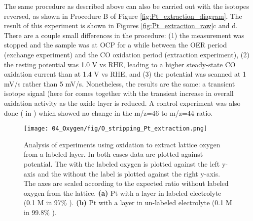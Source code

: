 The same procedure as described above can also be carried out with the isotopes reversed, as shown in Procedure B of Figure \ref{fig:Pt_extraction_diagram}. The result of this experiment is shown in Figures \ref{fig:Pt_extraction_raw}c and d. There are a couple small differences in the procedure: (1) the measurement was stopped and the sample was at OCP for a while between the OER period (exchange experiment) and the CO oxidation period (extraction experiment), (2) the resting potential was 1.0 V vs RHE, leading to a higher steady-state CO oxidation current than at 1.4 V vs RHE, and (3) the potential was scanned at 1 mV/s rather than 5 mV/s. Nonetheless, the results are the same: a transient isotope signal (here for  comes together with the transient increase in overall  oxidation activity as the oxide layer is reduced. A control experiment was also done ( in ) which showed no change in the m/z=46 to m/z=44 ratio.

\begin{figure}[h!]
	\centering
	\texttt{[image: 04\_Oxygen/fig/O\_stripping\_Pt\_extraction.png]}
	\caption{
		Analysis of experiments using  oxidation to extract lattice oxygen from a labeled  layer. In both cases data are plotted against potential. The  with the labeled oxygen is plotted against the left y-axis and the  without the label is plotted against the right y-axis. The axes are scaled according to the expected ratio without labeled oxygen from the lattice. \textbf{(a)} Pt with a  layer in labeled electrolyte (0.1 M  in 97\% ). \textbf{(b)} Pt with a  layer in un-labeled electrolyte (0.1 M  in 99.8\% ).
	}
	\label{fig:Pt_extraction}
\end{figure}

